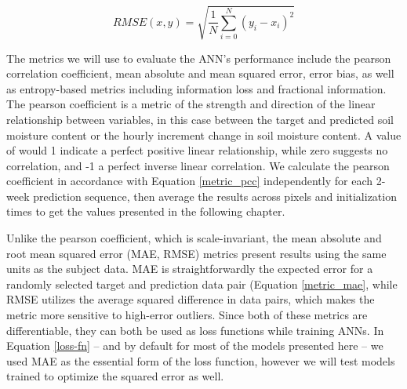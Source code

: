 \begin{equation}
    \label{metric_rmse}
    RMSE(x,y) = \sqrt{\frac{1}{N}\sum_{i=0}^{N}\left(y_i-x_i\right)^2}
\end{equation}

The metrics we will use to evaluate the ANN's performance include the pearson correlation coefficient, mean absolute and mean squared error, error bias, as well as entropy-based metrics including information loss and fractional information. The pearson coefficient is a metric of the strength and direction of the linear relationship between variables, in this case between the target and predicted soil moisture content or the hourly increment change in soil moisture content. A value of would 1 indicate a perfect positive linear relationship, while zero suggests no correlation, and -1 a perfect inverse linear correlation. We calculate the pearson coefficient in accordance with Equation \ref{metric_pcc} independently for each 2-week prediction sequence, then average the results across pixels and initialization times to get the values presented in the following chapter.

Unlike the pearson coefficient, which is scale-invariant, the mean absolute and root mean squared error (MAE, RMSE) metrics present results using the same units as the subject data. MAE is straightforwardly the expected error for a randomly selected target and prediction data pair (Equation \ref{metric_mae}, while RMSE utilizes the average squared difference in data pairs, which makes the metric more sensitive to high-error outliers. Since both of these metrics are differentiable, they can both be used as loss functions while training ANNs. In Equation \ref{loss-fn} -- and by default for most of the models presented here -- we used MAE as the essential form of the loss function, however we will test models trained to optimize the squared error as well.

